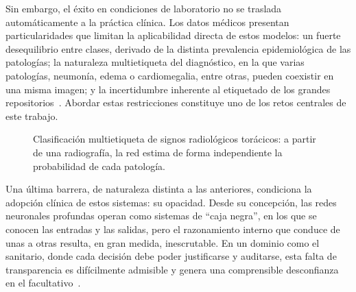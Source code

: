 Sin embargo, el éxito en condiciones de laboratorio no se traslada
automáticamente a la práctica clínica. Los datos médicos presentan
particularidades que limitan la aplicabilidad directa de estos modelos: un fuerte
desequilibrio entre clases, derivado de la distinta prevalencia epidemiológica de
las patologías; la naturaleza multietiqueta del diagnóstico, en la que varias
patologías, neumonía, edema o cardiomegalia, entre otras, pueden coexistir en una
misma imagen; y la incertidumbre inherente al etiquetado de los grandes
repositorios~\cite{lizDeepLearningMultilabel2023}. Abordar estas restricciones
constituye uno de los retos centrales de este trabajo.

\begin{figure}[ht]
\centering
{}
\caption{Clasificación multietiqueta de signos radiológicos torácicos: a partir de una
radiografía, la red estima de forma independiente la probabilidad de cada patología.}
\label{fig::intro_multietiqueta}
\end{figure}


Una última barrera, de naturaleza distinta a las anteriores, condiciona la
adopción clínica de estos sistemas: su opacidad. Desde su concepción, las redes
neuronales profundas operan como sistemas de ``caja negra'', en los que se
conocen las entradas y las salidas, pero el razonamiento interno que conduce de
unas a otras resulta, en gran medida, inescrutable. En un dominio como el
sanitario, donde cada decisión debe poder justificarse y auditarse, esta falta de
transparencia es difícilmente admisible y genera una comprensible desconfianza en
el facultativo~\cite{lizlopezDeepLearningInnovations2025, lizEnsemblesConvolutional2021}.


